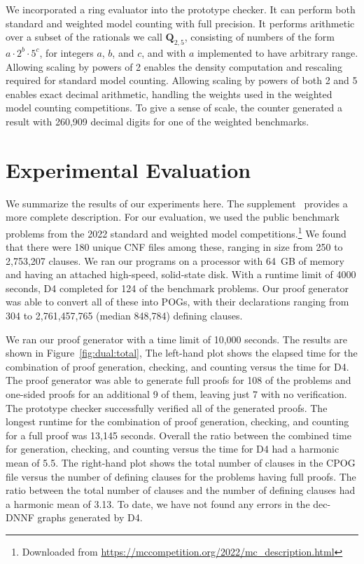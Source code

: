 \documentclass[letterpaper,USenglish,cleveref, autoref, thm-restate]{lipics-v2021}
\newcommand{\drational}{\textbf{Q}_{2,5}}
\newcommand{\progname}[1]{\textsc{#1}}
\newcommand{\dfour}{\progname{D4}}
\begin{document}
We incorporated a ring evaluator into the prototype checker.  It
can perform both standard and weighted
model counting with full precision.  It performs arithmetic over a subset of the rationals
we call $\drational$, consisting of numbers of the form $a \cdot 2^{b}
\cdot 5^{c}$, for integers $a$, $b$, and $c$, and with $a$ implemented
to have arbitrary range.  Allowing scaling by powers of 2 enables the
density computation and rescaling required for standard model
counting.  Allowing scaling by powers of both 2 and 5 enables exact
decimal arithmetic, handling the weights used in the weighted model
counting competitions.  To give a sense of scale, the counter
generated a result with 260,909 decimal digits
for one of the weighted benchmarks.


\section{Experimental Evaluation}
\label{sect:experimental}



We summarize the results of our experiments here.
The supplement~\cite{bryant:sat:2023:supplement}
provides a more complete description. For our
evaluation, we used the public benchmark problems from the 2022
standard and weighted model competitions.\footnote{Downloaded from \url{https://mccompetition.org/2022/mc_description.html}}  We found that there were
180 unique CNF files among these, ranging in size from 250 to
2,753,207 clauses.
We ran our programs on a processor with 64~GB of
memory and having an attached high-speed, solid-state
disk.
With a runtime limit of 4000 seconds, \dfour{} completed for 124 of the
benchmark problems.  Our proof generator was able to convert all of
these into POGs, with their declarations ranging from 304 to
2,761,457,765 (median 848,784) defining clauses.

We ran our proof generator with a time limit of 10,000 seconds.  The
results are shown in Figure~\ref{fig:dual:total}, The left-hand plot
shows the elapsed time for the combination of proof generation,
checking, and counting versus the time for
\dfour{}.
The proof generator was able to generate full proofs for 108 of the problems and
one-sided proofs for an additional 9 of them, leaving just 7 with no
verification.  The prototype checker successfully verified all of the generated
proofs.  The longest runtime for the combination of proof generation, checking, and counting
for a full proof was 13,145 seconds.
Overall the ratio
between the combined time for generation, checking, and counting versus the time
for \dfour{} had a harmonic mean of 5.5.
The right-hand plot shows the total number of clauses in the CPOG file versus the number of defining clauses for the problems having full proofs.
The ratio between the total number of clauses and the number of defining clauses had a harmonic mean of 3.13.
To date, we have not found
any errors in the dec-DNNF graphs generated by \dfour{}.
\end{document}
